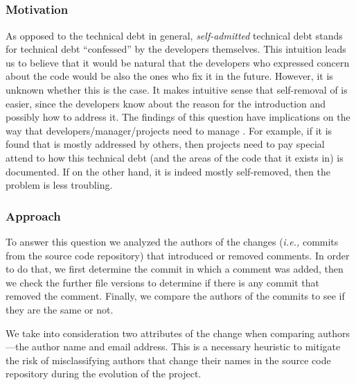 \subsection*{\rqii}

\subsubsection*{Motivation} As opposed to the technical debt in general, \emph{self-admitted} technical debt stands for technical debt ``confessed'' by the developers themselves. This intuition leads us to believe that it would be natural that the developers who expressed concern about the code would be also the ones who fix it in the future. However, it is unknown whether this is the case. It makes intuitive sense that self-removal of \SATD is easier, since the developers know about the reason for the \SATD introduction and possibly how to address it. The findings of this question have implications on the way that developers/manager/projects need to manage \SATD. For example, if it is found that \SATD is mostly addressed by others, then projects need to pay special attend to how this technical debt (and the areas of the code that it exists in) is documented. If on the other hand, it is indeed mostly self-removed, then the problem is less troubling.




\subsubsection*{Approach} To answer this question we analyzed the authors of the changes (\textit{i.e.,} commits from the source code repository) that introduced or removed \SATD comments. In order to do that, we first determine the commit in which a \SATD comment was added, then we check the further file versions to determine if there is any commit that removed the \SATD comment. Finally, we compare the authors of the commits to see if they are the same or not. 

We take into consideration two attributes of the change when comparing authors---the author name and email address. This is a necessary heuristic to mitigate the risk of misclassifying authors that change their names in the source code repository during the evolution of the project.  %


